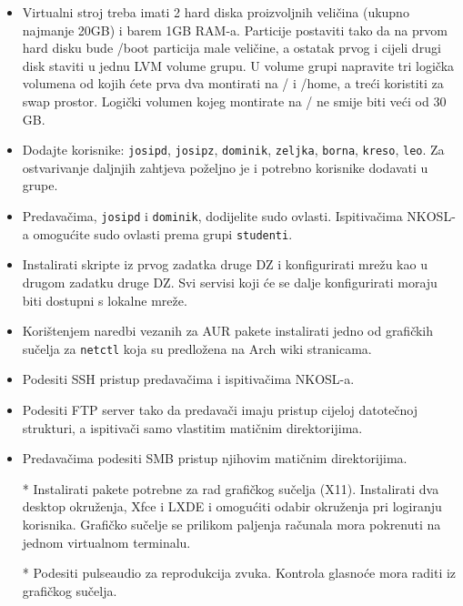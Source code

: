 \documentclass[12pt,a4paper]{article}
\begin{document}
	\hfill
	\hfill
	\begin{itemize}
		\item Virtualni stroj treba imati 2 hard diska proizvoljnih veličina (ukupno najmanje 20GB) i barem 1GB RAM-a. Particije postaviti tako da na prvom hard disku bude /boot particija male veličine, a ostatak prvog i cijeli drugi disk staviti u jednu LVM volume grupu. U volume grupi napravite tri logička volumena od kojih ćete prva dva montirati na / i /home, a treći koristiti za swap prostor. Logički volumen kojeg montirate na / ne smije biti veći od 30 GB.
  		
  		\item Dodajte korisnike: \texttt{josipd}, \texttt{josipz}, \texttt{dominik}, \texttt{zeljka}, \texttt{borna}, \texttt{kreso}, \texttt{leo}. Za ostvarivanje daljnjih zahtjeva poželjno je i potrebno korisnike dodavati u grupe.
  		
  		\item Predavačima, \texttt{josipd} i \texttt{dominik}, dodijelite sudo ovlasti. Ispitivačima NKOSL-a omogućite sudo ovlasti prema grupi \texttt{studenti}.
  		
  		\item Instalirati skripte iz prvog zadatka druge DZ i konfigurirati mrežu kao u drugom zadatku druge DZ. Svi servisi koji će se dalje konfigurirati moraju biti dostupni s lokalne mreže.
  		
  		\item Korištenjem naredbi vezanih za AUR pakete instalirati jedno od grafičkih sučelja za \texttt{netctl} koja su predložena na Arch wiki stranicama.
  		
  		\item Podesiti SSH pristup predavačima i ispitivačima NKOSL-a.
  		
  		\item Podesiti FTP server tako da predavači imaju pristup cijeloj datotečnoj strukturi, a ispitivači samo vlastitim matičnim direktorijima.
  		
  		\item Predavačima podesiti SMB pristup njihovim matičnim direktorijima.
  		
  		\item[*] Instalirati pakete potrebne za rad grafičkog sučelja (X11). Instalirati dva desktop okruženja, Xfce i LXDE i omogućiti odabir okruženja pri logiranju korisnika. Grafičko sučelje se prilikom paljenja računala mora pokrenuti na jednom virtualnom terminalu.
  		
  		\item[*] Podesiti pulseaudio za reprodukcija zvuka. Kontrola glasnoće mora raditi iz grafičkog sučelja.
  	\end{itemize}
\end{document}
